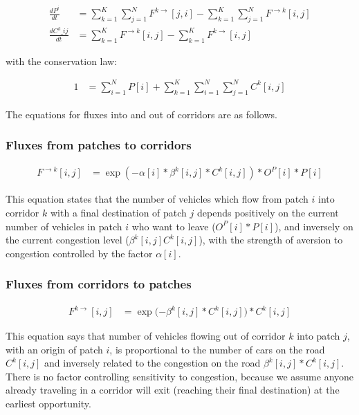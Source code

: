 \documentclass[
]{article}
\begin{document}
\begin{align}
    \frac{dP^i}{dt} &= \sum_{k=1}^K \sum_{j=1}^N F^{k\rightarrow}[j,i] - \sum_{k=1}^K \sum_{j=1}^N F^{\rightarrow k}[i,j] \\
    \frac{dC^{k}\_{ij}}{dt} &= \sum_{k=1}^K F^{\rightarrow k}[i,j] - \sum_{k=1}^K F^{k\rightarrow}[i,j]
\end{align}


with the conservation law:


\begin{align}
    1 &= \sum_{i=1}^N P[i] + \sum_{k=1}^K \sum_{i=1}^N \sum_{j=1}^N C^k[i,j]
\end{align}


The equations for fluxes into and out of corridors are as follows.

\subsubsection{Fluxes from patches to
corridors}\label{fluxes-from-patches-to-corridors}


\begin{align}
    F^{\rightarrow k}[i,j] &= \exp{(-\alpha[i] * \beta^k[i,j] * C^k[i,j])} * O^{P}[i] * P[i]
\end{align}


This equation states that the number of vehicles which flow from patch
\(i\) into corridor \(k\) with a final destination of patch \(j\)
depends positively on the current number of vehicles in patch \(i\) who
want to leave (\(O^{P}[i] * P[i]\)), and inversely on the current
congestion level (\(\beta^k[i,j] C^k[i,j]\)), with the strength of
aversion to congestion controlled by the factor \(\alpha[i]\).

\subsubsection{Fluxes from corridors to
patches}\label{fluxes-from-corridors-to-patches}


\begin{align}
    F^{k \rightarrow}[i,j] &= \exp{(-\beta^k[i,j] * C^k[i,j]}) * C^k[i,j]
\end{align}


This equation says that number of vehicles flowing out of corridor \(k\)
into patch \(j\), with an origin of patch \(i\), is proportional to the
number of cars on the road \(C^k[i,j]\) and inversely related to the
congestion on the road \(\beta^k[i,j] * C^k[i,j]\). There is no factor
controlling sensitivity to congestion, because we assume anyone already
traveling in a corridor will exit (reaching their final destination) at
the earliest opportunity.
\end{document}
